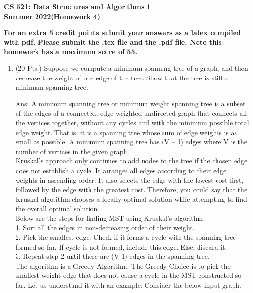 \documentclass{article}
\begin{document}
\begin{center}
\begin{LARGE}{\bf CS 521: Data Structures and Algorithms 1\\Summer
    2022(Homework 4)} \end{LARGE}

{\bf
For an extra 5 credit points submit your answers as a latex compiled with pdf. Please submit the .tex file and the .pdf file. Note this homework has a maximum score of 55.
}
\end{center}
\begin{enumerate}


\item (20 Pts.)   Suppose we compute a minimum spanning  tree of a
  graph, and  then decrease the weight  of one edge of  the tree. Show
  that the tree is still a minimum spanning tree. 
  
\item[Ans: ]A minimum spanning tree or minimum weight spanning tree is a subset of the edges of a connected, edge-weighted undirected graph that connects all the vertices together, without any cycles and with the minimum possible total edge weight. That is, it is a spanning tree whose sum of edge weights is as small as possible. A minimum spanning tree has (V – 1) edges where V is the number of vertices in the given graph. \\

Kruskal's approach only continues to add nodes to the tree if the chosen edge does not establish a cycle. It arranges all edges according to their edge weights in ascending order. It also selects the edge with the lowest cost first, followed by the edge with the greatest cost. Therefore, you could say that the Kruskal algorithm chooses a locally optimal solution while attempting to find the overall optimal solution.\\

Below are the steps for finding MST using Kruskal’s algorithm\\
1. Sort all the edges in non-decreasing order of their weight. \\
2. Pick the smallest edge. Check if it forms a cycle with the spanning tree formed so far. If cycle is not formed, include this edge. Else, discard it. \\
3. Repeat step 2 until there are (V-1) edges in the spanning tree. \\

The algorithm is a Greedy Algorithm. The Greedy Choice is to pick the smallest weight edge that does not cause a cycle in the MST constructed so far. Let us understand it with an example: Consider the below input graph.\\\\


\end{enumerate}
\end{document}
